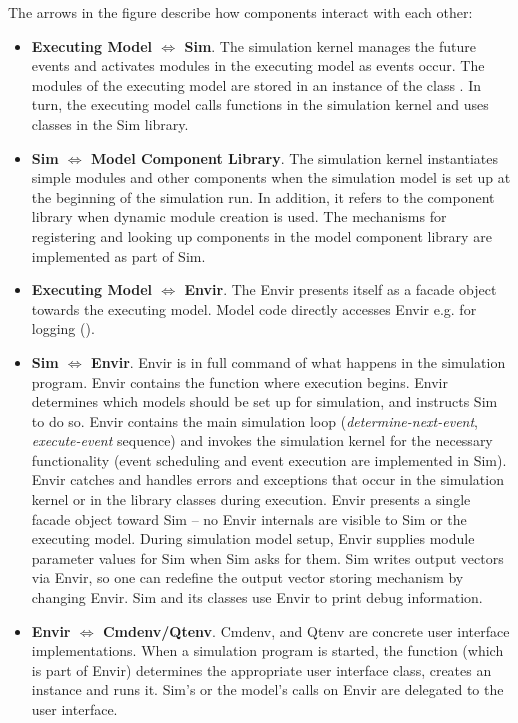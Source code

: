 The arrows in the figure describe how components interact with
each other:

\begin{itemize}
  \item \textbf{Executing Model $\Leftrightarrow$ Sim}. The simulation kernel
    manages the future events and activates modules in the executing model
    as events occur. The modules of the executing model are stored in an
    instance of the class . In turn, the executing model
    calls functions in the simulation kernel and uses classes in the Sim library.
  \item \textbf{Sim $\Leftrightarrow$ Model Component Library}. The simulation kernel
    instantiates simple modules and other components when the simulation model
    is set up at the beginning of the simulation run. In addition, it refers
    to the component library when dynamic module creation is used.
    The mechanisms for registering and looking up components in the model
    component library are implemented as part of Sim.
  \item \textbf{Executing Model $\Leftrightarrow$ Envir}. The Envir presents itself
    as a facade object towards the executing model. Model code directly accesses Envir
    e.g. for logging ().
  \item \textbf{Sim $\Leftrightarrow$ Envir}. Envir is in full command of what
    happens in the simulation program. Envir contains the  function
    where execution begins. Envir determines which models should be set up
    for simulation, and instructs Sim to do so. Envir contains the main
    simulation loop (\textit{determine-next-event}, \textit{execute-event}
    sequence) and invokes the simulation kernel for the necessary
    functionality (event scheduling and event execution are implemented in Sim).
    Envir catches and handles errors and exceptions that occur
    in the simulation kernel or in the library classes during execution.
    Envir presents a single facade object toward Sim -- no Envir
    internals are visible to Sim or the executing model.
    During simulation model setup, Envir supplies module parameter values for
    Sim when Sim asks for them. Sim writes output vectors via Envir,
    so one can redefine the output vector storing mechanism by changing Envir.
    Sim and its classes use Envir to print debug information.
  \item \textbf{Envir $\Leftrightarrow$ Cmdenv/Qtenv}. Cmdenv, and Qtenv
    are concrete user interface implementations. When a simulation program
    is started, the  function (which is part of Envir) determines
    the appropriate user interface class, creates an instance and runs it.
    Sim's or the model's calls on Envir are delegated to the user interface.
\end{itemize}


